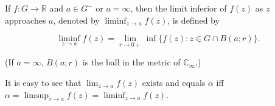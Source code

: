 If $f: G \to \mathbb{R}$ and $a \in G^{-}$ or $a = \infty$, then the limit inferior of $f(z)$ as $z$ approaches $a$, denoted by $\liminf_{z \to a} f(z)$, is defined by

$$\liminf_{z \to a} f(z) = \lim_{r \to 0+} \inf \{ f(z): z \in G \cap B(a; r) \}.$$

(If $a = \infty$, $B(a; r)$ is the ball in the metric of $\mathbb{C}_{\infty}$.)

It is easy to see that $\lim_{z \to a} f(z)$ exists and equals $\alpha$ iff $\alpha = \limsup_{z \to a} f(z) = \liminf_{z \to a} f(z)$.
